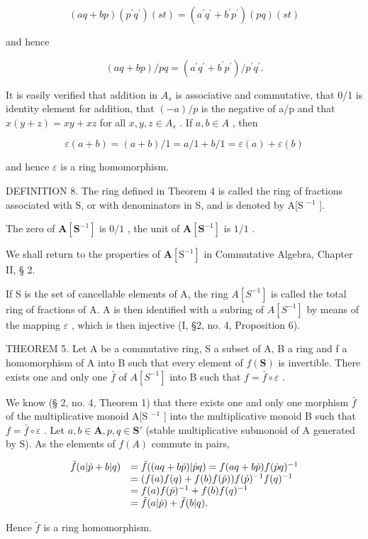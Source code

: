 \[
(a q + b p) \left(p ^ {\prime} q ^ {\prime}\right) (s t) = \left(a ^ {\prime} q ^ {\prime} + b ^ {\prime} p ^ {\prime}\right) (p q) (s t)
\]

and hence

\[
(a q + b p) / p q = (a ^ {\prime} q ^ {\prime} + b ^ {\prime} p ^ {\prime}) / p ^ {\prime} q ^ {\prime}.
\]

It is easily verified that addition in \(A_{s}\) is associative and commutative, that 0/1 is identity element for addition, that \((-a)/p\) is the negative of a/p and that \(x(y + z) = xy + xz\) for all \(x, y, z \in A_{s}\) . If \(a, b \in A\) , then

\[
\varepsilon (a + b) = (a + b) / 1 = a / 1 + b / 1 = \varepsilon (a) + \varepsilon (b)
\]

and hence \(\varepsilon\) is a ring homomorphism.

DEFINITION 8. The ring defined in Theorem 4 is called the ring of fractions associated with S, or with denominators in S, and is denoted by A{[}S \(^{-1}\) {]}.

The zero of \(\mathbf{A}[\mathbf{S}^{-1}]\) is \(0 / 1\) , the unit of \(\mathbf{A}[\mathbf{S}^{-1}]\) is \(1 / 1\) .

We shall return to the properties of \(\mathbf{A}[\mathrm{S}^{-1}]\) in Commutative Algebra, Chapter II, § 2.

If S is the set of cancellable elements of A, the ring \(A[S^{-1}]\) is called the total ring of fractions of A. A is then identified with a subring of \(A[S^{-1}]\) by means of the mapping \(\varepsilon\) , which is then injective (I, §2, no. 4, Proposition 6).

THEOREM 5. Let A be a commutative ring, S a subset of A, B a ring and f a homomorphism of A into B such that every element of \(f(\mathbf{S})\) is invertible. There exists one and only one \(\bar{f}\) of \(A[S^{-1}]\) into B such that \(f = \bar{f} \circ \varepsilon\) .

We know (§ 2, no. 4, Theorem 1) that there exists one and only one morphism \(\bar{f}\) of the multiplicative monoid A{[}S \(^{-1}\) {]} into the multiplicative monoid B such that \(f = \bar{f} \circ \varepsilon\) . Let \(a, b \in \mathbf{A}, p, q \in \mathbf{S}'\) (stable multiplicative submonoid of A generated by S). As the elements of \(f(A)\) commute in pairs,

\[
\begin{array}{r l} \bar {f} (a | \dot {p} + b | q) & = \bar {f} ((a q + b \dot {p}) | \dot {p} q) = f (a q + b \dot {p}) f (\dot {p} q) ^ {- 1} \\ & = (f (a) f (q) + f (b) f (\dot {p})) f (\dot {p}) ^ {- 1} f (q) ^ {- 1} \\ & = f (a) f (\dot {p}) ^ {- 1} + f (b) f (q) ^ {- 1} \\ & = \bar {f} (a | \dot {p}) + \bar {f} (b | q). \end{array}
\]

Hence \(\tilde{f}\) is a ring homomorphism.


